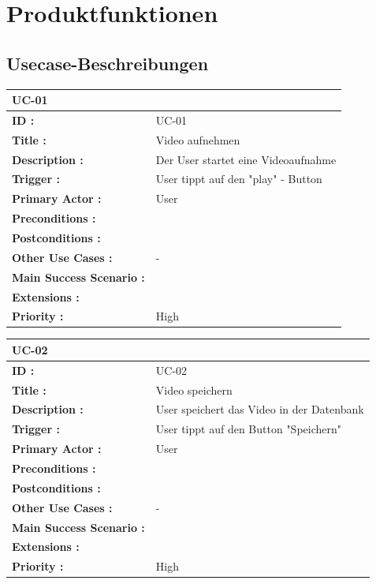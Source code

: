 		
	\section{\Large Produktfunktionen}
	\subsection{Usecase-Beschreibungen}
	\begin{table}[H]
		\begin{tabular}{|p{8cm}|p{8cm}|}
			\hline
			\textbf{UC-01 } \\ 
			\hline
			\textbf{ID :}\centering & UC-01  \\ \hline 
			\textbf{Title :}\centering & Video aufnehmen \\ \hline 
			\textbf{Description :}\centering & Der User startet eine Videoaufnahme \\ \hline 
			\textbf{Trigger :}\centering & User tippt auf den "play" - Button \\ \hline 
			\textbf{Primary Actor :} \centering & User \\ \hline 
			\textbf{Preconditions :}\centering & 
				\\ \hline 
			\textbf{Postconditions :}\centering &  
			 \\ \hline
			\textbf{Other Use Cases :}\centering & - \\ \hline  
			\textbf{Main Success Scenario :}\centering & 
			 \\ \hline  
			\textbf{Extensions :}\centering & \\ \hline  
			\textbf{Priority :}\centering & High \\ \hline  
		\end{tabular}
	\end{table}	
	
	\begin{table}[H]
		\begin{tabular}{|p{8cm}|p{8cm}|}
			\hline
			\textbf{UC-02 } \\ 
			\hline
			\textbf{ID :}\centering & UC-02  \\ \hline 
			\textbf{Title :}\centering & Video speichern \\ \hline 
			\textbf{Description :}\centering & User speichert das Video in der Datenbank \\ \hline 
			\textbf{Trigger :}\centering & User tippt auf den Button "Speichern" \\ \hline 
			\textbf{Primary Actor :} \centering & User \\ \hline 
			\textbf{Preconditions :}\centering & 
			\\ \hline 
			\textbf{Postconditions :}\centering & 
			 \\ \hline
			\textbf{Other Use Cases :}\centering & - \\ \hline  
			\textbf{Main Success Scenario :}\centering & 
			\\ \hline  
			\textbf{Extensions :}\centering &  \\ \hline  
			\textbf{Priority :}\centering & High \\ \hline  
		\end{tabular}
	\end{table}
	
